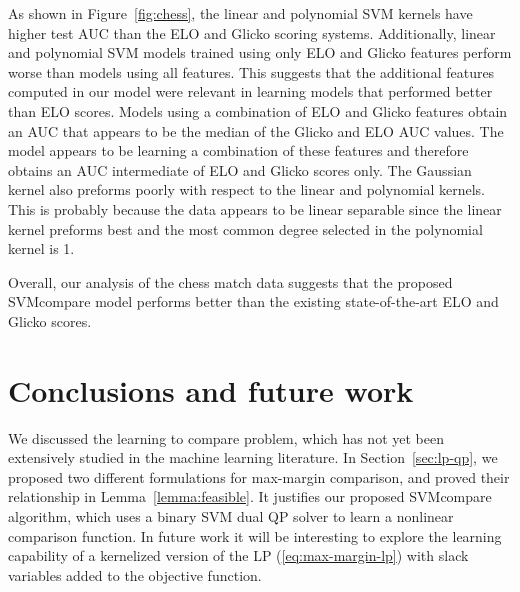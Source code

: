 \documentclass[twoside,11pt]{article}
\newcommand{\changed}[1]{
  #1
}
\begin{document}
As shown in Figure~\ref{fig:chess}, the linear and polynomial SVM kernels have
higher test AUC than the ELO and Glicko scoring systems.
Additionally, linear and polynomial SVM models trained using only ELO
and Glicko features perform worse than models using all features.  This suggests that the additional features computed in our model were
relevant in learning models that performed better than ELO scores.  Models using a combination of ELO and Glicko features obtain an AUC that appears to be the median of the Glicko and ELO AUC values.  The model appears to be learning a combination of these features and therefore obtains an AUC intermediate of ELO and Glicko scores only.  The Gaussian kernel also preforms poorly with respect to the linear and polynomial kernels.  This is probably because the data appears to be linear separable since the linear kernel preforms best and the most common degree selected in the polynomial kernel is 1.

Overall, our analysis of the chess match data suggests that the
proposed SVMcompare model performs better than the existing
state-of-the-art ELO and Glicko scores.

\begin{figure*}[b!]
	\centering
		
	\caption{Test AUC for each model used after training on the first 4 months of match data in the 8 different 12-month periods.  All SVM model AUCs are shown in addition to AUC of the ELO, Glicko scores and baseline.  The plots in black show the baseline AUC calculated by predicting the most common positive label.  The plots in dark blue are AUC values obtained from using Glicko or ELO scores only.  The plots in light blue show the AUC distribution from models using only ELO and Glicko features and plots in white are AUC values from models using all computed features.}
	\label{fig:chess}
\end{figure*}

\section{Conclusions and future work}
\label{sec:conclusions}

We discussed the learning to compare problem, which has not yet been
extensively studied in the machine learning literature. In
Section~\ref{sec:lp-qp}, we proposed two different formulations for
max-margin comparison, and proved their relationship in
Lemma~\ref{lemma:feasible}. It justifies our proposed SVMcompare
algorithm, which uses a binary SVM dual QP solver to learn a nonlinear
comparison function. \changed{In future work it will be interesting to explore
the learning capability of a kernelized version of the LP
(\ref{eq:max-margin-lp}) with slack variables added to the objective
function.}
\end{document}

